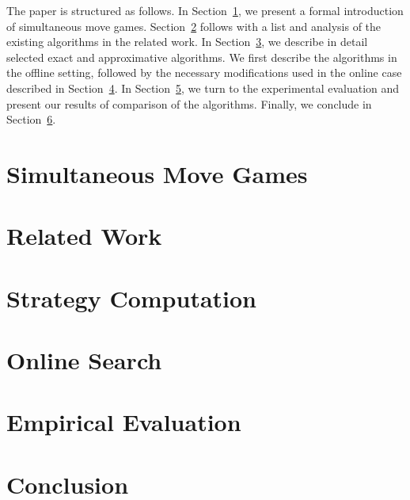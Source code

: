 \documentclass[preprint,12pt]{elsarticle}
\begin{document}
The paper is structured as follows. In Section~\ref{sec:smg}, we present a formal introduction of simultaneous move games. 
Section~\ref{sec:relwork} follows with a list and analysis of the existing algorithms in the related work. In 
Section~\ref{sec:offline}, we describe in detail selected exact and approximative algorithms.
We first describe the algorithms in the offline setting, followed by the necessary modifications used in the online case described in Section~\ref{sec:online}.
In Section~\ref{sec:eval}, we turn to the experimental evaluation and present our results of comparison of the algorithms.
Finally, we conclude in Section~\ref{sec:conc}.

\section{Simultaneous Move Games}  \label{sec:smg}

 

\section{Related Work} \label{sec:relwork}



\section{Strategy Computation} \label{sec:offline}

 

\section{Online Search} \label{sec:online}



\section{Empirical Evaluation} \label{sec:eval}



\section{Conclusion} \label{sec:conc}













\end{document}
